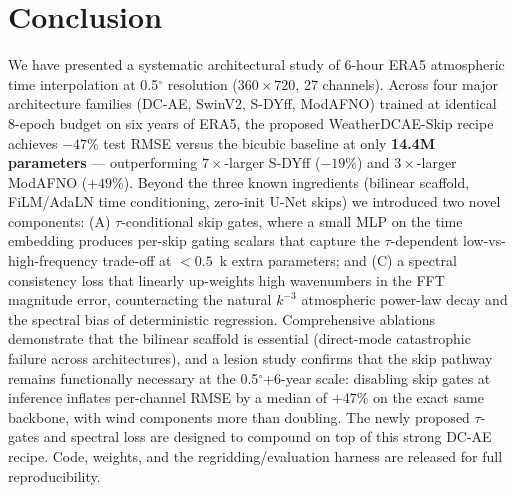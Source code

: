 \documentclass[10pt,letterpaper,twocolumn]{article}
\begin{document}




\section{Conclusion}

We have presented a systematic architectural study of 6-hour ERA5
atmospheric time interpolation at 0.5$^\circ$ resolution ($360{\times}720$,
27 channels). Across four major architecture families (DC-AE, SwinV2,
S-DYff, ModAFNO) trained at identical 8-epoch budget on six years of ERA5,
the proposed WeatherDCAE-Skip recipe achieves $-47\%$ test RMSE versus the bicubic
baseline at only \textbf{14.4M parameters} --- outperforming $7\times$-larger
S-DYff ($-19\%$) and $3\times$-larger ModAFNO ($+49\%$). Beyond the three
known ingredients (bilinear scaffold, FiLM/AdaLN time conditioning, zero-init
U-Net skips) we introduced two novel components: (A) $\tau$-conditional
skip gates, where a small MLP on the time embedding produces per-skip
gating scalars that capture the $\tau$-dependent low-vs-high-frequency
trade-off at $<0.5$~k extra parameters; and (C) a spectral consistency
loss that linearly up-weights high wavenumbers in the FFT magnitude
error, counteracting the natural $k^{-3}$ atmospheric power-law decay
and the spectral bias of deterministic regression. Comprehensive ablations demonstrate that the bilinear scaffold is
essential (direct-mode catastrophic failure across architectures), and
a lesion study confirms that the skip pathway remains functionally
necessary at the 0.5$^\circ$+6-year scale: disabling skip gates at
inference inflates per-channel RMSE by a median of $+47\%$ on the
exact same backbone, with wind components more than doubling. The
newly proposed $\tau$-gates and spectral loss are designed to compound
on top of this strong DC-AE recipe. Code, weights, and the regridding/evaluation harness are
released for full reproducibility.











\end{document}
